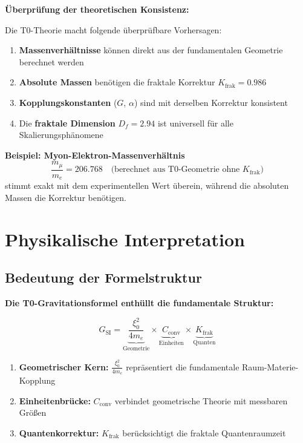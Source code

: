 \documentclass[12pt,a4paper]{article}
\begin{document}
	\begin{verification}
		\textbf{Überprüfung der theoretischen Konsistenz:}
		
		Die T0-Theorie macht folgende überprüfbare Vorhersagen:
		
		\begin{enumerate}
			\item \textbf{Massenverhältnisse} können direkt aus der fundamentalen Geometrie berechnet werden
			\item \textbf{Absolute Massen} benötigen die fraktale Korrektur $K_{\text{frak}} = 0.986$
			\item \textbf{Kopplungskonstanten} ($G$, $\alpha$) sind mit derselben Korrektur konsistent
			\item Die \textbf{fraktale Dimension} $D_f = 2.94$ ist universell für alle Skalierungsphänomene
		\end{enumerate}
		
		\textbf{Beispiel: Myon-Elektron-Massenverhältnis}
		\begin{equation}
			\frac{m_\mu}{m_e} = 206.768 \quad \text{(berechnet aus T0-Geometrie ohne $K_{\text{frak}}$)}
		\end{equation}
		stimmt exakt mit dem experimentellen Wert überein, während die absoluten Massen die Korrektur benötigen.
	\end{verification}
	
	\section{Physikalische Interpretation}
	
	\subsection{Bedeutung der Formelstruktur}
	
	\begin{keyresult}
		\textbf{Die T0-Gravitationsformel enthüllt die fundamentale Struktur:}
		
		\begin{equation}
			G_{\text{SI}} = \underbrace{\frac{\xi_0^2}{4 m_e}}_{\text{Geometrie}} \times \underbrace{C_{\text{conv}}}_{\text{Einheiten}} \times \underbrace{K_{\text{frak}}}_{\text{Quanten}}
		\end{equation}
		
		\begin{enumerate}
			\item \textbf{Geometrischer Kern:} $\frac{\xi_0^2}{4 m_e}$ repräsentiert die fundamentale Raum-Materie-Kopplung
			
			\item \textbf{Einheitenbrücke:} $C_{\text{conv}}$ verbindet geometrische Theorie mit messbaren Größen
			
			\item \textbf{Quantenkorrektur:} $K_{\text{frak}}$ berücksichtigt die fraktale Quantenraumzeit
		\end{enumerate}
	\end{keyresult}
	
\end{document}
